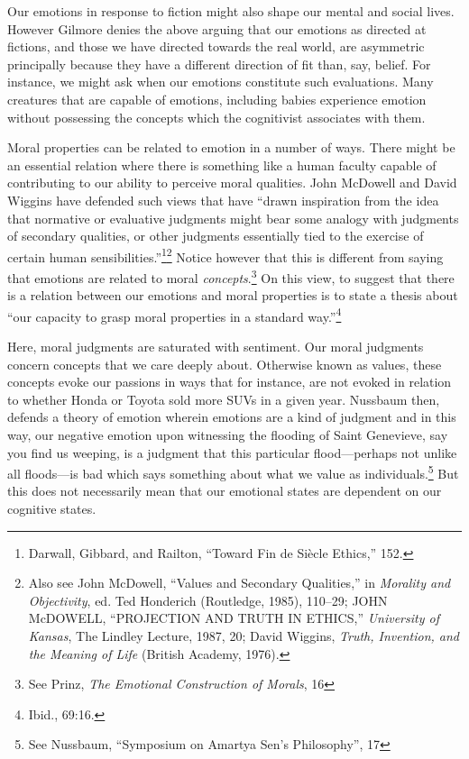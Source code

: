 \documentclass[phdthesis,12pt,final]{wuthesis}
\theoremstyle{definition}
\theoremstyle{definition}
\theoremstyle{definition}
\theoremstyle{definition}
\theoremstyle{remark}
\begin{document}
Our emotions in response to fiction might also shape our mental and social lives. However Gilmore denies the above arguing that our emotions as directed at fictions, and those we have directed towards the real world, are asymmetric principally because they have a different direction of fit than, say, belief. For instance, we might ask when our emotions constitute such evaluations. Many creatures that are capable of emotions, including babies experience emotion without possessing the concepts which the cognitivist associates with them.

Moral properties can be related to emotion in a number of ways. There might be an essential relation where there is something like a human faculty capable of contributing to our ability to perceive moral qualities. John McDowell and David Wiggins have defended such views that have ``drawn inspiration from the idea that normative or evaluative judgments might bear some analogy with judgments of secondary qualities, or other judgments essentially tied to the exercise of certain human sensibilities.''\footnote{Darwall, Gibbard, and Railton, {``Toward Fin de Siècle Ethics,''} 152.}\footnote{Also see John McDowell, {``Values and {Secondary Qualities},''} in \emph{Morality and {Objectivity}}, ed. Ted Honderich (Routledge, 1985), 110--29; JOHN McDOWELL, {``{PROJECTION AND TRUTH IN ETHICS},''} \emph{University of Kansas}, The {Lindley Lecture}, 1987, 20; David Wiggins, \emph{Truth, {Invention}, and the {Meaning} of {Life}} (British Academy, 1976).} Notice however that this is different from saying that emotions are related to moral \emph{concepts}.\footnote{See Prinz, \emph{The {Emotional Construction} of {Morals}}, 16} On this view, to suggest that there is a relation between our emotions and moral properties is to state a thesis about ``our capacity to grasp moral properties in a standard way.''\footnote{Ibid., 69:16.}

Here, moral judgments are saturated with sentiment. Our moral judgments concern concepts that we care deeply about. Otherwise known as values, these concepts evoke our passions in ways that for instance, are not evoked in relation to whether Honda or Toyota sold more SUVs in a given year. Nussbaum then, defends a theory of emotion wherein emotions are a kind of judgment and in this way, our negative emotion upon witnessing the flooding of Saint Genevieve, say you find us weeping, is a judgment that this particular flood---perhaps not unlike all floods---is bad which says something about what we value as individuals.\footnote{See Nussbaum, {``Symposium on {Amartya Sen}'s Philosophy''}, 17} But this does not necessarily mean that our emotional states are dependent on our cognitive states.
\end{document}
